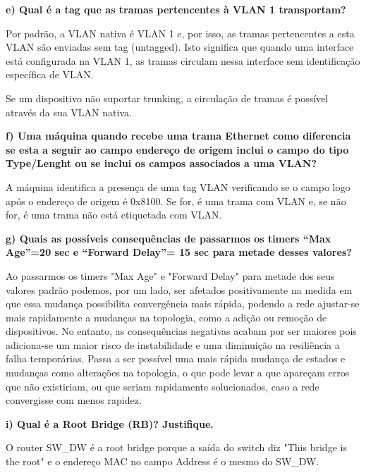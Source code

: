 \documentclass[11pt,english, openright, oneside]{book}
\begin{document}
\textbf{e) Qual é a tag que as tramas pertencentes à VLAN 1 transportam?}
\vspace{0.2cm}

Por padrão, a VLAN nativa é VLAN 1 e, por isso, as tramas pertencentes a esta
VLAN são enviadas sem tag (untagged). Isto significa que quando uma interface
está configurada na VLAN 1, as tramas circulam nessa interface sem identificação
específica de VLAN. 

Se um dispositivo não suportar trunking, a circulação de tramas é possível
através da sua VLAN nativa.
\vspace{0.8cm}


\textbf{f) Uma máquina quando recebe uma trama Ethernet como diferencia se esta a seguir ao campo endereço de origem inclui o campo do tipo Type/Lenght ou se inclui os campos associados a uma VLAN?}
\vspace{0.2cm}

A máquina identifica a presença de uma tag VLAN verificando se o campo logo após
o endereço de origem é 0x8100. Se for, é uma trama com VLAN e, se não for, é uma
trama não está etiquetada com VLAN.
\vspace{0.8cm}


\pagebreak
\textbf{g) Quais as possíveis consequências de passarmos os timers “Max Age”=20 sec e “Forward Delay”= 15 sec para metade desses valores?}
\vspace{0.2cm}

Ao passarmos os timers "Max Age" e "Forward Delay" para metade dos seus valores
padrão podemos, por um lado, ser afetados positivamente na medida em que essa
mudança possibilita convergência mais rápida, podendo a rede ajustar-se mais
rapidamente a mudanças na topologia, como a adição ou remoção de dispositivos.
No entanto, as consequências negativas acabam por ser maiores pois adiciona-se
um maior risco de instabilidade e uma diminuição na resiliência a falha
temporárias. Passa a ser possível uma mais rápida mudança de estados e mudanças
como alterações na topologia, o que pode levar a que apareçam erros que não
existiriam, ou que seriam rapidamente solucionados, caso a rede convergisse com
menos rapidez.
\vspace{0.8cm}


\textbf{i) Qual é a Root Bridge (RB)? Justifique.}
\label{quest:1i}
\vspace{0.2cm}

O router SW\_DW é a root bridge porque a saída do switch diz "This bridge is the
root" e o endereço MAC no campo Address é o mesmo do SW\_DW.
\end{document}
